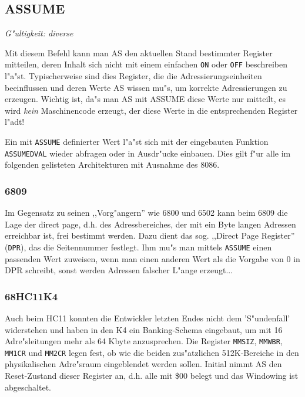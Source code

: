 \documentclass[12pt,a4paper,twoside]{report}
\makeatletter
\newcommand{\tty}[1]{{\tt #1}}
\newcommand{\ttindex}[1]{\index{#1@{\tt #1}}}
\makeatother
\begin{document}
{%

\subsection{ASSUME}
\ttindex{ASSUME}


{\em G"ultigkeit: diverse}

Mit diesem Befehl kann man AS den aktuellen Stand bestimmter Register
mitteilen, deren Inhalt sich nicht mit einem einfachen \tty{ON} oder
\tty{OFF} beschreiben l"a"st.  Typischerweise sind dies Register, die die
Adressierungseinheiten beeinflussen und deren Werte AS wissen mu"s, um
korrekte Adressierungen zu erzeugen.  Wichtig ist, da"s man AS mit ASSUME
diese Werte nur mitteilt, es wird {\em kein} Maschinencode erzeugt, der
diese Werte in die entsprechenden Register l"adt!

Ein mit \tty{ASSUME} definierter Wert l"a"st sich mit der
eingebauten Funktion \tty{ASSUMEDVAL} wieder abfragen oder in
Ausdr"ucke einbauen.  Dies gilt f"ur alle im folgenden gelisteten
Architekturen mit Ausnahme des 8086.


\subsubsection{6809}

Im Gegensatz zu seinen ,,Vorg"angern'' wie 6800 und 6502 kann beim
6809 die Lage der direct page, d.h. des Adressbereiches, der mit ein
Byte langen Adressen erreichbar ist, frei bestimmt werden.  Dazu dient
das sog. ,,Direct Page Register'' (\tty{DPR}), das die Seitennummer
festlegt.  Ihm mu"s man mittels \tty{ASSUME} einen passenden Wert
zuweisen, wenn man einen anderen Wert als die Vorgabe von 0 in DPR
schreibt, sonst werden Adressen falscher L"ange erzeugt...



\subsubsection{68HC11K4}

Auch beim HC11 konnten die Entwickler letzten Endes nicht dem
'S"undenfall' widerstehen und haben in den K4 ein Banking-Schema
eingebaut, um mit 16 Adre"sleitungen mehr als 64 Kbyte anzusprechen.  Die
Register {\tt MMSIZ}, {\tt MMWBR}, {\tt MM1CR} und {\tt MM2CR} legen fest,
ob wie die beiden zus"atzlichen 512K-Bereiche in den physikalischen
Adre"sraum eingeblendet werden sollen.  Initial nimmt AS den Reset-Zustand
dieser Register an, d.h. alle mit \$00 belegt und das Windowing ist
abgeschaltet.

}
\end{document}
